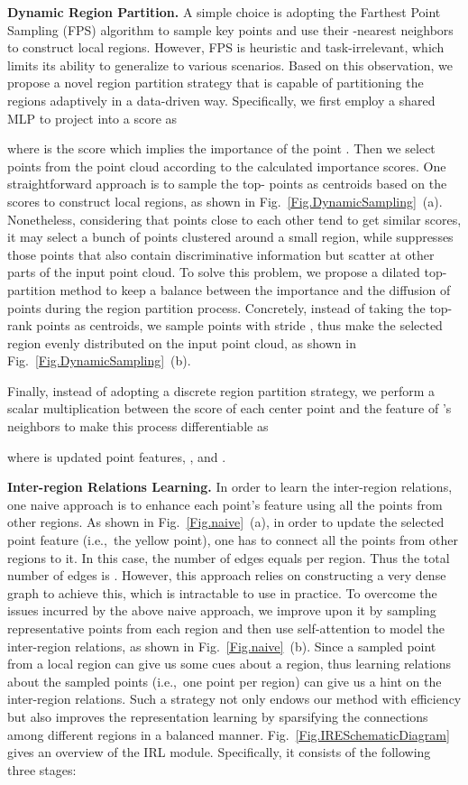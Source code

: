 \documentclass[journal]{IEEEtran}
\begin{document}
\noindent\textbf{Dynamic Region Partition.} A simple choice is adopting the Farthest Point Sampling (FPS) algorithm to sample key points and use their -nearest neighbors to construct local regions. However, FPS is heuristic and task-irrelevant, which limits its ability to generalize to various scenarios. Based on this observation, we propose a novel region partition strategy that is capable of partitioning the regions adaptively in a data-driven way.  
Specifically, we first employ a shared MLP to project  into a score  as

where  is the score which implies the importance of the point .
Then we select  points from the point cloud according to the calculated importance scores. 
One straightforward approach is to sample the top- points as centroids based on the scores to construct local regions, as shown in Fig.~\ref{Fig.DynamicSampling}~(a). Nonetheless, considering that points close to each other tend to get similar scores, it may select a bunch of points clustered around a small region, while suppresses those points that also contain discriminative information but scatter at other parts of the input point cloud. To solve this problem, we propose a dilated top- partition method to keep a balance between the importance and the diffusion of points during the region partition process. Concretely, instead of taking the top-rank points as centroids, we sample  points with stride , thus make the selected region evenly distributed on the input point cloud, as shown in Fig.~\ref{Fig.DynamicSampling}~(b). 

Finally, instead of adopting a discrete region partition strategy, we perform a scalar multiplication between the score  of each center point  and the feature  of 's neighbors to make this process differentiable as 

where  is updated point features,  , and  .




\noindent\textbf{Inter-region Relations Learning.} In order to learn the inter-region relations, one naive approach is to enhance each point's feature using all the points from other regions. As shown in Fig.~\ref{Fig.naive}~(a), in order to update the selected point feature (i.e.,~the yellow point), one has to connect all the points from other regions to it. In this case, the number of edges equals  per region. Thus the total number of edges is . 
However, this approach relies on constructing a very dense graph to achieve this, which is intractable to use in practice. To overcome the issues incurred by the above naive approach, we improve upon it by sampling representative points from each region and then use self-attention to model the inter-region relations, as shown in Fig.~\ref{Fig.naive}~(b). Since a sampled point from a local region can give us some cues about a region, thus learning relations about the sampled  points (i.e.,~one point per region) can give us a hint on the inter-region relations. Such a strategy not only endows our method with efficiency but also improves the representation learning by sparsifying the connections among different regions in a balanced manner. Fig.~\ref{Fig.IRESchematicDiagram} gives an overview of the IRL module. Specifically, it consists of the following three stages:
\end{document}
